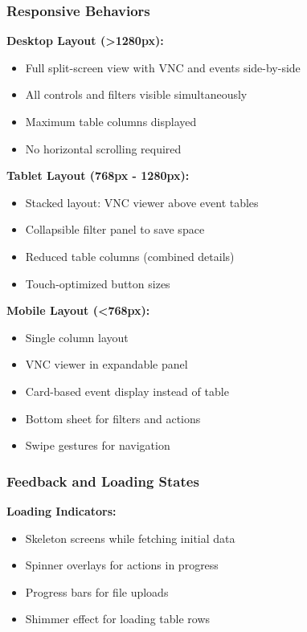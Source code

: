 \subsubsection{Responsive Behaviors}

\textbf{Desktop Layout (>1280px):}
\begin{itemize}
    \item Full split-screen view with VNC and events side-by-side
    \item All controls and filters visible simultaneously
    \item Maximum table columns displayed
    \item No horizontal scrolling required
\end{itemize}

\textbf{Tablet Layout (768px - 1280px):}
\begin{itemize}
    \item Stacked layout: VNC viewer above event tables
    \item Collapsible filter panel to save space
    \item Reduced table columns (combined details)
    \item Touch-optimized button sizes
\end{itemize}

\textbf{Mobile Layout (<768px):}
\begin{itemize}
    \item Single column layout
    \item VNC viewer in expandable panel
    \item Card-based event display instead of table
    \item Bottom sheet for filters and actions
    \item Swipe gestures for navigation
\end{itemize}

\subsubsection{Feedback and Loading States}

\textbf{Loading Indicators:}
\begin{itemize}
    \item Skeleton screens while fetching initial data
    \item Spinner overlays for actions in progress
    \item Progress bars for file uploads
    \item Shimmer effect for loading table rows
\end{itemize}

